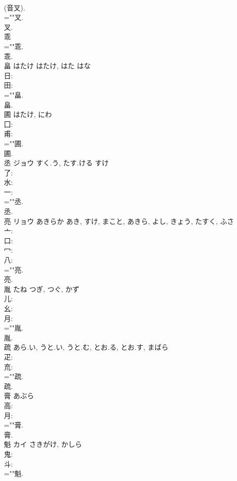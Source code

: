 \documentclass[8pt]{extreport}
\begin{document}
\begin{CJK}{UTF8}{min}
\\	(音叉). 
\\	=""叉.
\\	叉.
\\	乖						
\\	=""乖.
\\	乖.
\\	畠	はたけ	はたけ, はた	はな	
\\	日: 
\\	田: 
\\	=""畠.
\\	畠.
\\	圃		はたけ, にわ				
\\	囗: 
\\	甫: 
\\	=""圃.
\\	圃.
\\	丞	ジョウ	すく.う, たす.ける	すけ	
\\	了: 
\\	水: 
\\	一: 
\\	=""丞.
\\	丞.
\\	亮	リョウ	あきらか	あき, すけ, まこと, あきら, よし, きょう, たすく, ふさ	
\\	亠: 
\\	口: 
\\	冖: 
\\	八: 
\\	=""亮.
\\	亮.
\\	胤		たね	つぎ, つぐ, かず			
\\	儿: 
\\	幺: 
\\	月: 
\\	=""胤.
\\	胤.
\\	疏		あら.い, うと.い, うと.む, とお.る, とお.す, まばら				
\\	疋: 
\\	㐬: 
\\	=""疏.
\\	疏.
\\	膏		あぶら				
\\	高: 
\\	月: 
\\	=""膏.
\\	膏.
\\	魁	カイ	さきがけ, かしら		
\\	鬼: 
\\	斗: 
\\	=""魁.

\end{CJK}
\end{document}

